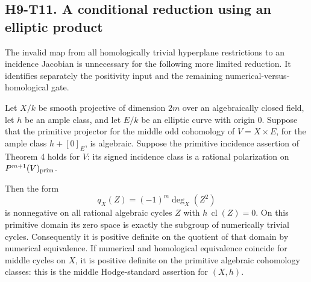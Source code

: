 
\subsection*{H9-T11. A conditional reduction using an elliptic product}

The invalid map from all homologically trivial hyperplane restrictions
to an incidence Jacobian is unnecessary for the following more limited
reduction. It identifies separately the positivity input and the remaining
numerical-versus-homological gate.

\begin{proposition}[H9-T11]
Let $X/k$ be smooth projective of dimension $2m$ over an algebraically
closed field, let $h$ be an ample class, and let $E/k$ be an elliptic
curve with origin $0$. Suppose that the primitive projector for the
middle odd cohomology of $V=X\times E$, for the ample class
$h+[0]_E$, is algebraic. Suppose the primitive incidence assertion of
Theorem 4 holds for $V$: its signed incidence class is a rational
polarization on $P^{m+1}(V)_{\rm prim}$.

Then the form
\[
 q_X(Z)=(-1)^m\deg_X(Z^2)
\]
is nonnegative on all rational algebraic cycles $Z$ with
$h\,\operatorname{cl}(Z)=0$. On this primitive domain its zero space
is exactly the subgroup of numerically trivial cycles. Consequently
it is positive definite on the quotient of that domain by numerical
equivalence. If numerical and homological equivalence coincide for
middle cycles on $X$, it is positive definite on the primitive
algebraic cohomology classes: this is the middle Hodge-standard
assertion for $(X,h)$.
\end{proposition}

